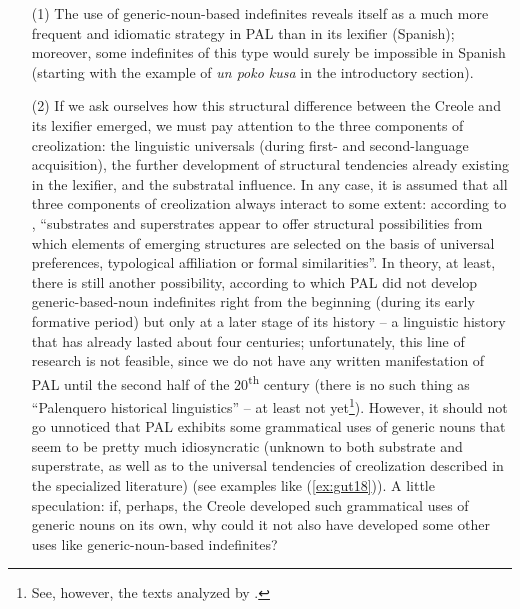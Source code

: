 \documentclass[output=paper,colorlinks,citecolor=brown]{langscibook}
\begin{document}
\begin{enumerate}
    \item[(1)] The use of generic-noun-based indefinites reveals itself as a much more frequent and idiomatic strategy in PAL than in its lexifier (Spanish); moreover, some indefinites of this type would surely be impossible in Spanish (starting with the example of \textit{un poko kusa} in the introductory section).
    \item[(2)] If we ask ourselves how this structural difference between the Creole and its lexifier emerged, we must pay attention to the three components of creolization: the linguistic universals (during first- and second-language acquisition), the further development of structural tendencies already existing in the lexifier, and the substratal influence. In any case, it is assumed that all three components of creolization always interact to some extent: according to \citet[][1]{NeumannHolzschuhSchneider2000}, “substrates and superstrates appear to offer structural possibilities from which elements of emerging structures are selected on the basis of universal preferences, typological affiliation or formal similarities”. In theory, at least, there is still another possibility, according to which PAL did not develop generic-based-noun indefinites right from the beginning (during its early formative period) but only at a later stage of its history -- a linguistic history that has already lasted about four centuries; unfortunately, this line of research is not feasible, since we do not have any written manifestation of PAL until the second half of the 20\textsuperscript{th} century (there is no such thing as “Palenquero historical linguistics” -- at least not yet\footnote{See, however, the texts analyzed by \citet{GutiérrezMaté2012}.}). However, it should not go unnoticed that PAL exhibits some grammatical uses of generic nouns that seem to be pretty much idiosyncratic (unknown to both substrate and superstrate, as well as to the universal tendencies of creolization described in the specialized literature) (see examples like (\ref{ex:gut18})). A little speculation: if, perhaps, the Creole developed such grammatical uses of generic nouns on its own, why could it not also have developed some other uses like generic-noun-based indefinites?

\end{enumerate}
\end{document}
